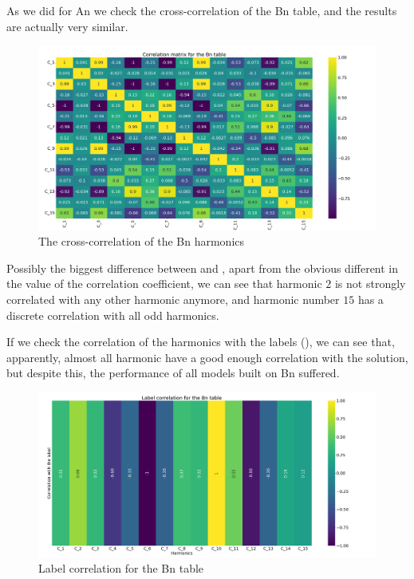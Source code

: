 As we did for An we check the cross-correlation of the Bn table, and the results are actually very
similar.
\begin{figure}[h!]
	\centering
	\includegraphics[width=\linewidth]{img/Bn_corr_matrix.png}
	\caption{The cross-correlation of the Bn harmonics} \label{fig:bn-corr}
\end{figure}
Possibly the biggest difference between  and , apart from the
obvious different in the value of the correlation coefficient, we can see that harmonic $2$ is not
strongly correlated with any other harmonic anymore, and harmonic number $15$ has a discrete
correlation with all odd harmonics.

If we check the correlation of the harmonics with the labels (), we can see that, apparently, almost all
harmonic have a good enough correlation with the solution, but despite this, the performance of all
models built on Bn suffered.
\begin{figure}
	\centering
	\includegraphics[width=\linewidth]{img/Bn_label_corr.png}
	\caption{Label correlation for the Bn table} \label{fig:bn-lcorr}
\end{figure}


